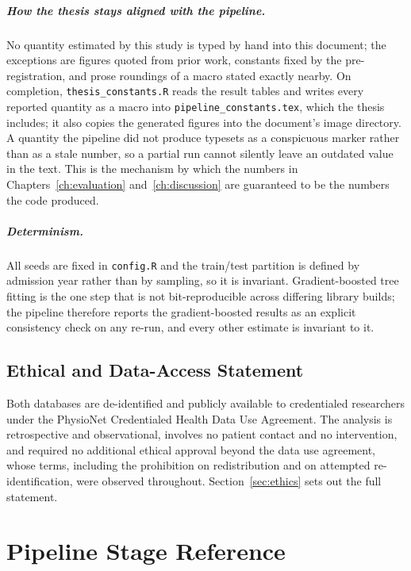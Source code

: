 \paragraph{How the thesis stays aligned with the pipeline.} No quantity
estimated by this study is typed by hand into this document; the exceptions are
figures quoted from prior work, constants fixed by the pre-registration, and
prose roundings of a macro stated exactly nearby. On completion,
\texttt{thesis\_constants.R}
reads the result tables and writes every reported quantity as a macro into
\texttt{pipeline\_constants.tex}, which the thesis includes; it also copies the
generated figures into the document's image directory. A quantity the pipeline
did not produce typesets as a conspicuous marker rather than as a stale number,
so a partial run cannot silently leave an outdated value in the text. This is
the mechanism by which the numbers in Chapters~\ref{ch:evaluation}
and~\ref{ch:discussion} are guaranteed to be the numbers the code produced.

\paragraph{Determinism.} All seeds are fixed in \texttt{config.R} and the
train/test partition is defined by admission year rather than by sampling, so
it is invariant. Gradient-boosted tree fitting is the one step that is not
bit-reproducible across differing library builds; the pipeline therefore
reports the gradient-boosted results as an explicit consistency check on any
re-run, and every other estimate is invariant to it.

\section{Ethical and Data-Access Statement}

Both databases are de-identified and publicly available to credentialed
researchers under the PhysioNet Credentialed Health Data Use Agreement. The
analysis is retrospective and observational, involves no patient contact and no
intervention, and required no additional ethical approval beyond the data use
agreement, whose terms, including the prohibition on redistribution and on
attempted re-identification, were observed throughout.
Section~\ref{sec:ethics} sets out the full statement.


\chapter{Pipeline Stage Reference}
\label{app:stages}

